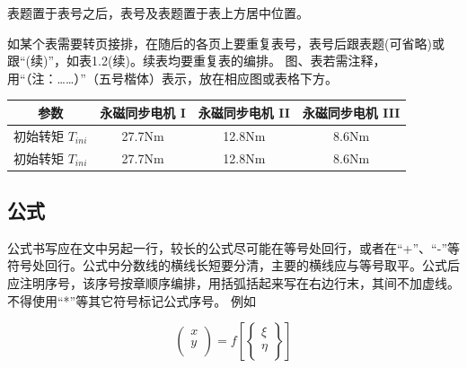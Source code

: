 表题置于表号之后，表号及表题置于表上方居中位置。

如某个表需要转页接排，在随后的各页上要重复表号，表号后跟表题(可省略)或跟“(续)”，如表1.2(续)。续表均要重复表的编排。
图、表若需注释，用“（注：……）”（五号楷体）表示，放在相应图或表格下方。

\begin{table}[!ht]
	\centering
	 \label{rotationalframe}
\end{table}

\begin{table}[h]
	\centering
	\renewcommand{\arraystretch}{1.5} %
	\setlength{\tabcolsep}{15pt} %
	\begin{tabular}{cccc}
		\toprule[1.5pt]
		参数 & 永磁同步电机 I & 永磁同步电机 II & 永磁同步电机 III \\ \midrule[0.75pt]
		初始转矩 \(T_{ini}\) & 27.7Nm & 12.8Nm & 8.6Nm\\
		初始转矩 \(T_{ini}\) & 27.7Nm & 12.8Nm & 8.6Nm \\ \bottomrule[1.5pt]  
	\end{tabular}
\end{table}


\subsection{公式}
公式书写应在文中另起一行，较长的公式尽可能在等号处回行，或者在“+”、“-”等符号处回行。公式中分数线的横线长短要分清，主要的横线应与等号取平。公式后应注明序号，该序号按章顺序编排，用括弧括起来写在右边行末，其间不加虚线。不得使用“*”等其它符号标记公式序号。   
例如

\begin{equation}\label{transformation}
	\left(\begin{array}{l}
		x \\
		y \\
	\end{array}\right)=f\left[\left\{\begin{array}{l}
		\xi \\
		\eta \\
	\end{array}\right\}\right]
\end{equation}

